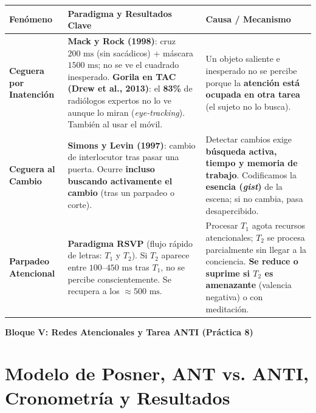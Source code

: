 \documentclass[11pt,a4paper]{article}
\newcommand{\bloque}[1]{%
  \vspace{0.6em}
  \begin{tcolorbox}[colback=Primary,colframe=Primary,arc=3pt,left=12pt,right=12pt,top=8pt,bottom=8pt,boxrule=0pt,after skip=8pt]
    {\Large\bfseries\color{white} #1}
  \end{tcolorbox}
}
\begin{document}
\vspace{0.2em}
\begin{center}
\renewcommand{\arraystretch}{1.4}
\begin{tabularx}{\textwidth}{@{}>{\raggedright\arraybackslash}p{3.1cm}>{\raggedright\arraybackslash}X>{\raggedright\arraybackslash}p{5.8cm}@{}}
\toprule
\rowcolor{Primary!15}
\textbf{Fenómeno} & \textbf{Paradigma y Resultados Clave} & \textbf{Causa / Mecanismo} \\
\midrule
\textbf{Ceguera por Inatención} & \textbf{Mack y Rock (1998)}: cruz $200\text{ ms}$ (sin sacádicos) + máscara $1500\text{ ms}$; no se ve el cuadrado inesperado. \textbf{Gorila en TAC (Drew et al., 2013)}: el \textbf{83\%} de radiólogos expertos no lo ve aunque lo miran (\textit{eye-tracking}). También al usar el móvil. & Un objeto saliente e inesperado no se percibe porque la \textbf{atención está ocupada en otra tarea} (el sujeto no lo busca). \\
\textbf{Ceguera al Cambio} & \textbf{Simons y Levin (1997)}: cambio de interlocutor tras pasar una puerta. Ocurre \textbf{incluso buscando activamente el cambio} (tras un parpadeo o corte). & Detectar cambios exige \textbf{búsqueda activa, tiempo y memoria de trabajo}. Codificamos la \textbf{esencia (\textit{gist})} de la escena; si no cambia, pasa desapercibido. \\
\textbf{Parpadeo Atencional} & \textbf{Paradigma RSVP} (flujo rápido de letras: $T_1$ y $T_2$). Si $T_2$ aparece entre \textbf{$100\text{--}450\text{ ms}$} tras $T_1$, no se percibe conscientemente. Se recupera a los \textbf{$\approx 500\text{ ms}$}. & Procesar $T_1$ agota recursos atencionales; $T_2$ se procesa parcialmente sin llegar a la conciencia. \textbf{Se reduce o suprime si $T_2$ es amenazante} (valencia negativa) o con meditación. \\
\bottomrule
\end{tabularx}
\end{center}

\newpage
\bloque{Bloque V: Redes Atencionales y Tarea ANTI (Práctica 8)}
\setcounter{section}{0}

\section{Modelo de Posner, ANT vs. ANTI, Cronometría y Resultados}
\end{document}
